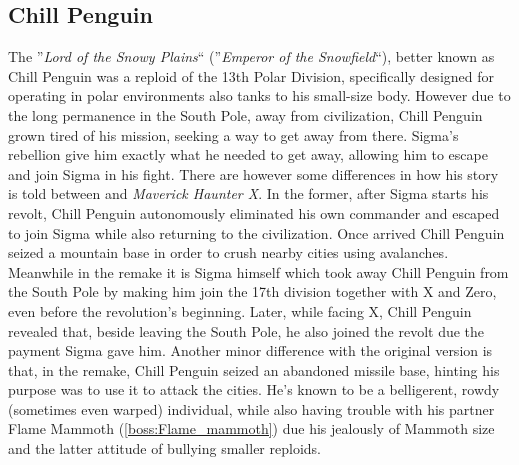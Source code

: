 \subsection{Chill Penguin}\label{boss:Chill_Penguin}
The ''\textit{Lord of the Snowy Plains}``\cite{MHX:manual} (''\textit{Emperor of the Snowfield}``\cite{wayback:X_resources}), better known as Chill Penguin was a reploid of the 13th Polar Division, specifically designed for operating in polar environments also tanks to his small-size body. However due to the long permanence in the South Pole, away from civilization, Chill Penguin grown tired of his mission, seeking a way to get away from there. Sigma's rebellion give him exactly what he needed to get away, allowing him to escape and join Sigma in his fight. There are however some differences in how his story is told between \x and \textit{Maverick Haunter X}. In the former, after Sigma starts his revolt, Chill Penguin autonomously eliminated his own commander and escaped to join Sigma while also returning to the civilization\cite{Xcoll1:Manual_X1}. Once arrived Chill Penguin seized a mountain base in order to crush nearby cities using avalanches. Meanwhile in the remake it is Sigma himself which took away Chill Penguin from the South Pole by making him join the 17th division together with X and Zero, even before the revolution's beginning\cite{MHX:manual}. Later, while facing X, Chill Penguin revealed that, beside leaving the South Pole, he also joined the revolt due the payment Sigma gave him\cite{wiki:MMX_script}. Another minor difference with the original version is that, in the remake, Chill Penguin seized an abandoned missile base, hinting his purpose was to use it to attack the cities. He's known to be a belligerent, rowdy (sometimes even warped) individual, while also having trouble with his partner Flame Mammoth (\ref{boss:Flame_mammoth}) due his jealously of Mammoth size and the latter attitude of bullying smaller reploids.


